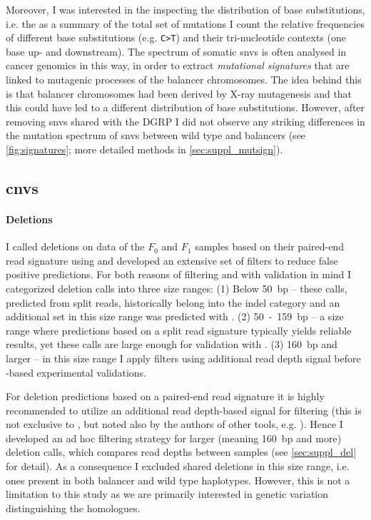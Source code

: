 Moreover, I was interested in the inspecting the distribution of base
substitutions, i.e. the 
    {as a summary of the total set of
    mutations I count the relative frequencies of different base substitutions
    (e.g. \texttt{C>T}) and their tri-nucleotide contexts (one base up- and
    downstream). The spectrum of somatic \acp{snv} is often analysed in cancer
    genomics in this way, in order to extract \emph{mutational signatures} that
    are linked to mutagenic processes}
 of the balancer chromosomes. The idea behind this is that balancer chromosomes
 had been derived by X-ray mutagenesis and that this could have led to a
 different distribution of base substitutions. However, after removing \acp{snv}
 shared with the DGRP I did not observe any striking differences in the mutation
 spectrum of \acp{snv} between wild type and balancers (see
 \cref{fig:signatures}; more detailed methods in \cref{sec:suppl_mutsign}).






\subsection{\texorpdfstring{\Aclp{cnv}}{Copy number variants}}
\label{sec:balancer_cnv}

\paragraph{Deletions} I called deletions on \wgs data of the $F_0$ and $F_1$
samples based on their paired-end read signature using \delly and developed an
extensive set of filters to reduce false positive predictions. For both reasons
of filtering and with validation in mind I categorized deletion calls into three
size ranges: (1) Below 50~bp -- these calls, predicted from split reads,
historically belong into the indel category and an additional set in this size
range was predicted with \freebayes. (2) 50~-~159~bp -- a size range where
predictions based on a split read signature typically yields reliable results,
yet these calls are large enough for validation with \pcr.
(3) 160~bp and larger -- in this size range I apply filters using additional
read depth signal before \pcr-based experimental validations.

For deletion predictions based on a paired-end read signature it is highly
recommended to utilize an additional read depth-based signal for filtering
(this is not exclusive to \delly, but noted also by the authors of other tools,
e.g. \cite{Layer2014}). Hence I developed an ad hoc filtering strategy
for larger (meaning 160~bp and more) deletion calls, which compares read depths
between samples (see \cref{sec:suppl_del} for detail). As a consequence I
excluded shared deletions in this size range, i.e. ones present in both balancer
and wild type haplotypes. However, this is not a limitation to this study as we
are primarily interested in genetic variation distinguishing the homologues.

